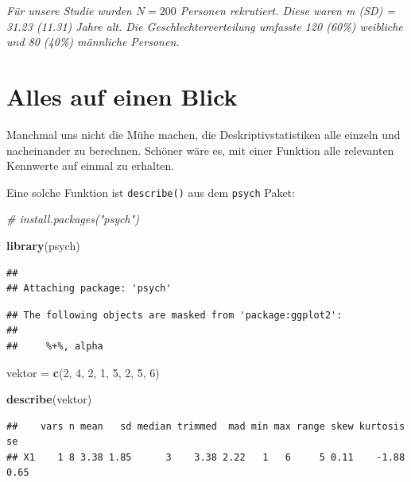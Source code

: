 \documentclass[
]{book}
\newenvironment{Shaded}{\begin{snugshade}}{\end{snugshade}}
\newcommand{\CommentTok}[1]{\textcolor[rgb]{0.56,0.35,0.01}{\textit{#1}}}
\newcommand{\DecValTok}[1]{\textcolor[rgb]{0.00,0.00,0.81}{#1}}
\newcommand{\FunctionTok}[1]{\textcolor[rgb]{0.13,0.29,0.53}{\textbf{#1}}}
\newcommand{\NormalTok}[1]{#1}
\newcommand{\OtherTok}[1]{\textcolor[rgb]{0.56,0.35,0.01}{#1}}
\begin{document}
\emph{Für unsere Studie wurden \(N=200\) Personen rekrutiert. Diese waren m (SD) = 31.23 (11.31) Jahre alt. Die Geschlechterverteilung umfasste 120 (60\%) weibliche und 80 (40\%) männliche Personen.}

\section{Alles auf einen Blick}\label{alles-auf-einen-blick}

Manchmal uns nicht die Mühe machen, die Deskriptivstatistiken alle einzeln und nacheinander zu berechnen. Schöner wäre es, mit einer Funktion alle relevanten Kennwerte auf einmal zu erhalten.

Eine solche Funktion ist \texttt{describe()} aus dem \texttt{psych} Paket:

\begin{Shaded}
\begin{Highlighting}[]
\CommentTok{\# install.packages("psych")}

\FunctionTok{library}\NormalTok{(psych)}
\end{Highlighting}
\end{Shaded}

\begin{verbatim}
## 
## Attaching package: 'psych'
\end{verbatim}

\begin{verbatim}
## The following objects are masked from 'package:ggplot2':
## 
##     %+%, alpha
\end{verbatim}

\begin{Shaded}
\begin{Highlighting}[]
\NormalTok{vektor }\OtherTok{=} \FunctionTok{c}\NormalTok{(}\DecValTok{2}\NormalTok{, }\DecValTok{4}\NormalTok{, }\DecValTok{2}\NormalTok{, }\DecValTok{1}\NormalTok{, }\DecValTok{5}\NormalTok{, }\DecValTok{2}\NormalTok{, }\DecValTok{5}\NormalTok{, }\DecValTok{6}\NormalTok{)}

\FunctionTok{describe}\NormalTok{(vektor)}
\end{Highlighting}
\end{Shaded}

\begin{verbatim}
##    vars n mean   sd median trimmed  mad min max range skew kurtosis   se
## X1    1 8 3.38 1.85      3    3.38 2.22   1   6     5 0.11    -1.88 0.65
\end{verbatim}
\end{document}
